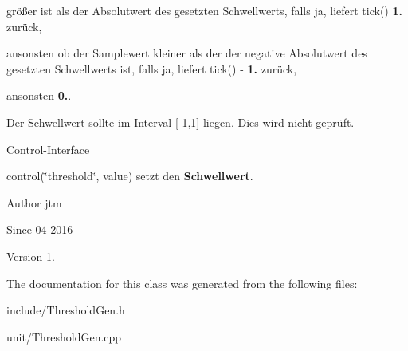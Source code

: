 \begin{DoxyItemize}
\item größer ist als der Absolutwert des gesetzten Schwellwerts, falls ja, liefert tick() {\bfseries 1.} zurück,
\item ansonsten ob der Samplewert kleiner als der der negative Absolutwert des gesetzten Schwellwerts ist, falls ja, liefert tick() -\/ {\bfseries 1.} zurück,
\item ansonsten {\bfseries 0.}.
\end{DoxyItemize}

Der Schwellwert sollte im Interval \mbox{[}-\/1,1\mbox{]} liegen. Dies wird nicht geprüft.

Control-\/\+Interface


\begin{DoxyItemize}
\item control(\char`\"{}threshold\char`\"{}, value) setzt den {\bfseries Schwellwert}.
\end{DoxyItemize}

\begin{DoxyAuthor}{Author}
jtm 
\end{DoxyAuthor}
\begin{DoxySince}{Since}
04-\/2016 
\end{DoxySince}
\begin{DoxyVersion}{Version}
1. 
\end{DoxyVersion}


The documentation for this class was generated from the following files\+:\begin{DoxyCompactItemize}
\item 
include/Threshold\+Gen.\+h\item 
unit/Threshold\+Gen.\+cpp\end{DoxyCompactItemize}
